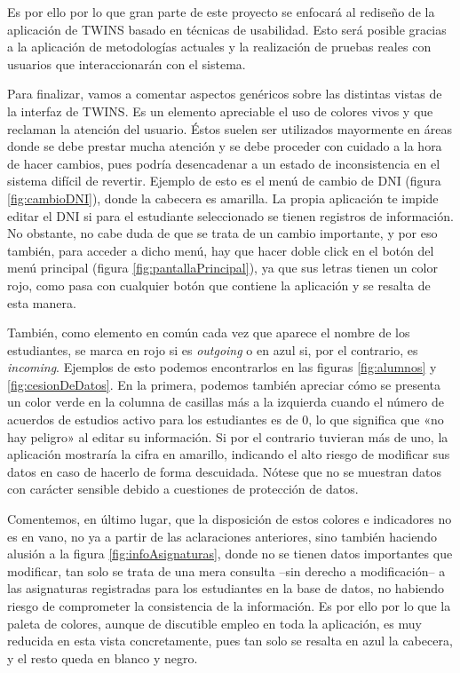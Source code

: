 Es por ello por lo que gran parte de este proyecto se enfocará al rediseño de la aplicación de TWINS basado en técnicas de usabilidad. Esto será posible gracias a la aplicación de metodologías actuales y la realización de pruebas reales con usuarios que interaccionarán con el sistema.

Para finalizar, vamos a comentar aspectos genéricos sobre las distintas vistas de la interfaz de TWINS. Es un elemento apreciable el uso de colores vivos y que reclaman la atención del usuario. Éstos suelen ser utilizados mayormente en áreas donde se debe prestar mucha atención y se debe proceder con cuidado a la hora de hacer cambios, pues podría desencadenar a un estado de inconsistencia en el sistema difícil de revertir. Ejemplo de esto es el menú de cambio de DNI (figura \ref{fig:cambioDNI}), donde la cabecera es amarilla. La propia aplicación te impide editar el DNI si para el estudiante seleccionado se tienen registros de información. No obstante, no cabe duda de que se trata de un cambio importante, y por eso también, para acceder a dicho menú, hay que hacer doble click en el botón del menú principal (figura \ref{fig:pantallaPrincipal}), ya que sus letras tienen un color rojo, como pasa con cualquier botón que contiene la aplicación y se resalta de esta manera.

También, como elemento en común cada vez que aparece el nombre de los estudiantes, se marca en rojo si es \textit{outgoing} o en azul si, por el contrario, es \textit{incoming}. Ejemplos de esto podemos encontrarlos en las figuras \ref{fig:alumnos} y \ref{fig:cesionDeDatos}. En la primera, podemos también apreciar cómo se presenta un color verde en la columna de casillas más a la izquierda cuando el número de acuerdos de estudios activo para los estudiantes es de 0, lo que significa que «no hay peligro» al editar su información. Si por el contrario tuvieran más de uno, la aplicación mostraría la cifra en amarillo, indicando el alto riesgo de modificar sus datos en caso de hacerlo de forma descuidada. Nótese que no se muestran datos con carácter sensible debido a cuestiones de protección de datos.

Comentemos, en último lugar, que la disposición de estos colores e indicadores no es en vano, no ya a partir de las aclaraciones anteriores, sino también haciendo alusión a la figura \ref{fig:infoAsignaturas}, donde no se tienen datos importantes que modificar, tan solo se trata de una mera consulta --sin derecho a modificación-- a las asignaturas registradas para los estudiantes en la base de datos, no habiendo riesgo de comprometer la consistencia de la información. Es por ello por lo que la paleta de colores, aunque de discutible empleo en toda la aplicación, es muy reducida en esta vista concretamente, pues tan solo se resalta en azul la cabecera, y el resto queda en blanco y negro.



